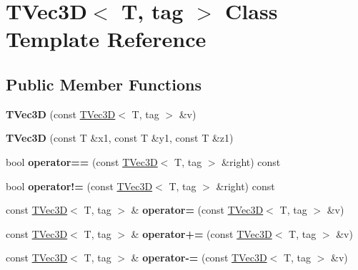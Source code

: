 \hypertarget{classTVec3D}{}\section{T\+Vec3D$<$ T, tag $>$ Class Template Reference}
\label{classTVec3D}
\subsection*{Public Member Functions}
\begin{DoxyCompactItemize}
\item 
\mbox{\label{classTVec3D_a360a19434c2271145c405383232db2e1}} 
{\bfseries T\+Vec3D} (const \hyperlink{classTVec3D}{T\+Vec3D}$<$ T, tag $>$ \&v)
\item 
\mbox{\label{classTVec3D_a6ef10ba0045185681fc7ad8bb74a5da0}} 
{\bfseries T\+Vec3D} (const T \&x1, const T \&y1, const T \&z1)
\item 
\mbox{\label{classTVec3D_a950482b27e968457f7e2a844bc4aa725}} 
bool {\bfseries operator==} (const \hyperlink{classTVec3D}{T\+Vec3D}$<$ T, tag $>$ \&right) const
\item 
\mbox{\label{classTVec3D_a9742cfba2258897eb3f8e1dae978de08}} 
bool {\bfseries operator!=} (const \hyperlink{classTVec3D}{T\+Vec3D}$<$ T, tag $>$ \&right) const
\item 
\mbox{\label{classTVec3D_a96ec7671367ee8a5417d3c8d59aedb6c}} 
const \hyperlink{classTVec3D}{T\+Vec3D}$<$ T, tag $>$ \& {\bfseries operator=} (const \hyperlink{classTVec3D}{T\+Vec3D}$<$ T, tag $>$ \&v)
\item 
\mbox{\label{classTVec3D_a9776f36d598109ff7c3174539a810ddd}} 
const \hyperlink{classTVec3D}{T\+Vec3D}$<$ T, tag $>$ \& {\bfseries operator+=} (const \hyperlink{classTVec3D}{T\+Vec3D}$<$ T, tag $>$ \&v)
\item 
\mbox{\label{classTVec3D_a3d806e67df228137f0c16c9f9bb99afc}} 
const \hyperlink{classTVec3D}{T\+Vec3D}$<$ T, tag $>$ \& {\bfseries operator-\/=} (const \hyperlink{classTVec3D}{T\+Vec3D}$<$ T, tag $>$ \&v)
\item 
\mbox{\label{classTVec3D_ae2843e1092fc4b74bc8d77535d214ee7}} 

\end{DoxyCompactItemize}
